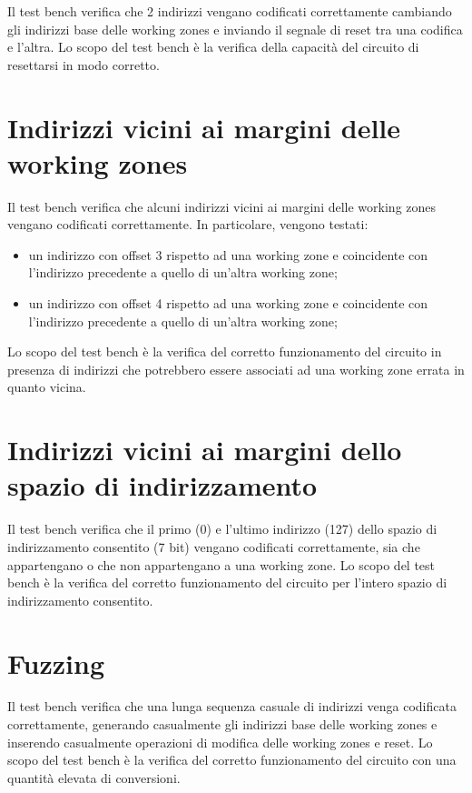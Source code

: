 \documentclass[10pt,english, openany]{book}
\begin{document}
Il test bench verifica che 2 indirizzi vengano codificati correttamente cambiando gli indirizzi base delle working zones e inviando il segnale di reset tra una codifica e l’altra. Lo scopo del test bench è la verifica della capacità del circuito di resettarsi in modo corretto.

\section{Indirizzi vicini ai margini delle working zones}

Il test bench verifica che alcuni indirizzi vicini ai margini delle working zones vengano codificati correttamente. In particolare, vengono testati:
\begin{itemize}
    \item un indirizzo con offset 3 rispetto ad una working zone e coincidente        con l’indirizzo precedente a quello di un’altra working zone;
    \item un indirizzo con offset 4 rispetto ad una working zone e coincidente        con l’indirizzo precedente a quello di un’altra working zone;
\end{itemize}{}
Lo scopo del test bench è la verifica del corretto funzionamento del circuito in presenza di indirizzi che potrebbero essere associati ad una working zone errata in quanto vicina.
 
\section{Indirizzi vicini ai margini dello spazio di indirizzamento}

Il test bench verifica che il primo (0) e l’ultimo indirizzo (127) dello spazio di indirizzamento consentito (7 bit) vengano codificati correttamente, sia che appartengano o che non appartengano a una working zone. Lo scopo del test bench è la verifica del corretto funzionamento del circuito per l’intero spazio di indirizzamento consentito.

\section{Fuzzing}

Il test bench verifica che una lunga sequenza casuale di indirizzi venga codificata correttamente, generando casualmente gli indirizzi base delle working zones e inserendo casualmente operazioni di modifica delle working zones e reset. Lo scopo del test bench è la verifica del corretto funzionamento del circuito con una quantità elevata di conversioni.
\end{document}
